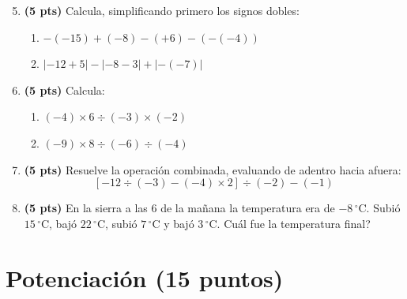 \documentclass[12pt, letterpaper]{article}
\begin{document}
\begin{enumerate}[leftmargin=*]
  \setcounter{enumi}{4}
  \item \textbf{(5 pts)} Calcula, simplificando primero los signos dobles:
        \begin{enumerate}[label=\alph*)]
          \item $-(-15) + (-8) - (+6) - (-(-4))$
          \item $|{-12} + 5| - |{-8} - 3| + |-(-7)|$
        \end{enumerate}

  \item \textbf{(5 pts)} Calcula:
        \begin{enumerate}[label=\alph*)]
          \item $(-4) \times 6 \div (-3) \times (-2)$
          \item $(-9) \times 8 \div (-6) \div (-4)$
        \end{enumerate}

  \item \textbf{(5 pts)} Resuelve la operación combinada, evaluando de adentro hacia afuera:
        \[
          [-12 \div (-3) - (-4) \times 2] \div (-2) - (-1)
        \]

  \item \textbf{(5 pts)} En la sierra a las 6 de la mañana la temperatura era de $-8\,^{\circ}$C. Subió $15\,^{\circ}$C, bajó $22\,^{\circ}$C, subió $7\,^{\circ}$C y bajó $3\,^{\circ}$C. \textquestiondown Cuál fue la temperatura final?
\end{enumerate}

\section{Potenciación (15 puntos)}
\end{document}
